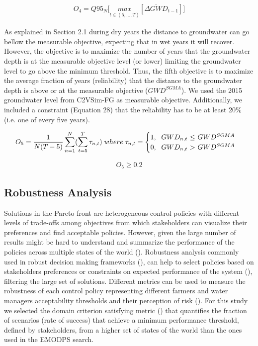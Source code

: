 \documentclass[11pt,a4paper]{article}
\begin{document}
\begin{align}
O_{4} = Q95_{N} \bigg[\underset{t\in(5,...,T)}{max}[\overline{\Delta GWD}_{t-1}]\bigg]
\end{align}

As explained in Section 2.1 during dry years the distance to groundwater can go bellow the measurable objective, expecting that in wet years it will recover. However, the objective is to maximize the number of years that the groundwater depth is at the measurable objective level (or lower) limiting the groundwater level to go above the minimum threshold. Thus, the fifth objective is to maximize the average fraction of years (reliability) that the distance to the groundwater depth is above or at the measurable objective ($GWD^{SGMA}$).  We used the 2015 groundwater level from C2VSim-FG as measurable objective. Additionally, we included a constraint (Equation 28) that the reliability has to be at least 20\% (i.e. one of every five years). 

\begin{align}
O_{5} = \frac{1}{N(T-5)}\sum_{n=1}^N(\sum_{t=5}^T \tau_{n,t})\; where\; \tau_{n,t} = \begin{cases}
      1, \text{\; $GWD_{n,t}$  $\leq$ $GWD^{SGMA}$}\\
      0, \text{\; $GWD_{n,t}$ $>$ $GWD^{SGMA}$}\\
\end{cases}      
\end{align}


\begin{align}
O_{5} \geq 0.2
\end{align}

\subsection{Robustness Analysis}

Solutions in the Pareto front are heterogeneous control policies with different levels of trade-offs among objectives from which stakeholders can visualize their preferences and find acceptable policies. However, given the large number of results might be hard to understand and summarize the performance of the policies across multiple states of the world (\cite{herman_how_2015}). Robustness analysis commonly used in robust decision making frameworks (\cite{marchau_decision_2019}), can help to select policies based on stakeholders preferences or constraints on expected performance of the system (\cite{kasprzyk_many_2013}), filtering the large set of solutions. Different metrics can be used to measure the robustness of each control policy representing different farmers and water managers acceptability thresholds and their perception of risk (\cite{mcphail_robustness_2018}). For this study we selected the domain criterion satisfying metric (\cite{schneller_decision_1983}) that quantifies the fraction of scenarios (rate of success) that achieve a minimum performance threshold, defined by stakeholders, from a higher set of states of the world than the ones used in the EMODPS search. 
\end{document}
